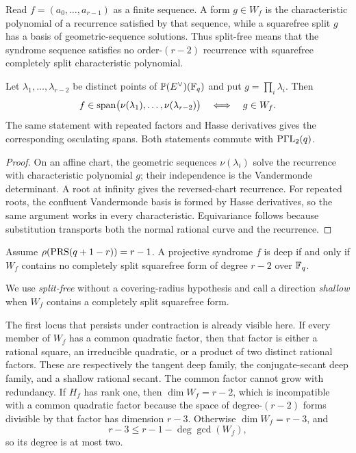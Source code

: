 Read \(f=(a_0,\ldots,a_{r-1})\) as a finite sequence.  A form
\(g\in W_f\) is the characteristic polynomial of a recurrence
satisfied by that sequence, while a squarefree split \(g\) has a basis
of geometric-sequence solutions.  Thus split-free means that the
syndrome sequence satisfies no order-\((r-2)\) recurrence with
squarefree completely split characteristic polynomial.

\begin{lemma}\label{lem:hankel}%
%
%
Let $\lambda_1,\ldots,\lambda_{r-2}$ be distinct points of
$\mathbb P(E^\vee)(\mathbb F_q)$ and put $g=\prod_i\lambda_i$.  Then
\[
 f\in\operatorname{span}\bigl(\nu(\lambda_1),\ldots,\nu(\lambda_{r-2})\bigr)
 \quad\Longleftrightarrow\quad g\in W_f.
\]
The same statement with repeated factors and Hasse derivatives gives
the corresponding osculating spans.  Both statements commute with
$\mathrm{P}\Gamma\mathrm{L}_2(q)$.
\end{lemma}

\begin{proof}
On an affine chart, the geometric sequences
\(\nu(\lambda_i)\) solve the recurrence with characteristic polynomial
\(g\); their independence is the Vandermonde determinant.  A root at
infinity gives the reversed-chart recurrence.  For repeated roots, the
confluent Vandermonde basis is formed by Hasse derivatives, so the same
argument works in every characteristic.  Equivariance follows because
substitution transports both the normal rational curve and the
recurrence.
\end{proof}

\begin{corollary}\label{cor:splitfree}%
%
%
Assume $\rho(\operatorname{PRS}(q+1-r))=r-1$.  A projective syndrome $f$ is deep if
and only if $W_f$ contains no completely split squarefree form of
degree $r-2$ over $\mathbb F_q$.
\end{corollary}

We use \emph{split-free} without a covering-radius hypothesis and call
a direction \emph{shallow} when \(W_f\) contains a completely split
squarefree form.

The first locus that persists under contraction is already visible
here.  If every member of $W_f$ has a common quadratic factor, then
that factor is either a
rational square, an irreducible quadratic, or a product of two distinct
rational factors.  These are respectively the tangent deep family, the
conjugate-secant deep family, and a shallow rational secant.  The common
factor cannot grow with redundancy.  If \(H_f\) has rank one, then
\(\dim W_f=r-2\), which is incompatible with a common quadratic factor
because the space of degree-\((r-2)\) forms divisible by that factor has
dimension \(r-3\).  Otherwise \(\dim W_f=r-3\), and
\[
 r-3\leq r-1-\deg\gcd(W_f),
\]
so its degree is at most two.

